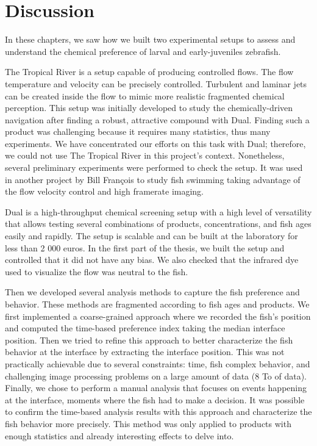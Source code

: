   \chapter{Discussion}
  \label{discussion}
  In these chapters, we saw how we built two experimental setups to assess and understand the chemical preference of larval and early-juveniles zebrafish.

  The Tropical River is a setup capable of producing controlled flows. The flow temperature and velocity can be precisely controlled. Turbulent and laminar jets can be created inside the flow to mimic more realistic fragmented chemical perception. This setup was initially developed to study the chemically-driven navigation after finding a robust, attractive compound with Dual. Finding such a product was challenging because it requires many statistics, thus many experiments. We have concentrated our efforts on this task with Dual; therefore, we could not use The Tropical River in this project's context. Nonetheless, several preliminary experiments were performed to check the setup. It was used in another project by Bill François to study fish swimming taking advantage of the flow velocity control and high framerate imaging.

  Dual is a high-throughput chemical screening setup with a high level of versatility that allows testing several combinations of products, concentrations, and fish ages easily and rapidly. The setup is scalable and can be built at the laboratory for less than 2 000 euros. In the first part of the thesis, we built the setup and controlled that it did not have any bias. We also checked that the infrared dye used to visualize the flow was neutral to the fish.

  Then we developed several analysis methods to capture the fish preference and behavior. These methods are fragmented according to fish ages and products. We first implemented a coarse-grained approach where we recorded the fish's position and computed the time-based preference index taking the median interface position. Then we tried to refine this approach to better characterize the fish behavior at the interface by extracting the interface position. This was not practically achievable due to several constraints: time, fish complex behavior, and challenging image processing problems on a large amount of data (8 To of data). Finally, we chose to perform a manual analysis that focuses on events happening at the interface, moments where the fish had to make a decision. It was possible to confirm the time-based analysis results with this approach and characterize the fish behavior more precisely. This method was only applied to products with enough statistics and already interesting effects to delve into.

